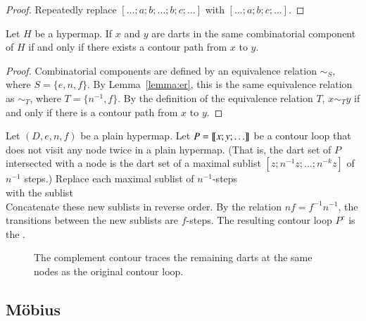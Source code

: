 \begin{proof} Repeatedly replace $[\ldots;a;b;\ldots;b;c;\ldots]$ with
$[\ldots;a;b;c;\ldots]$.
\end{proof}





\begin{lemma}  
Let $H$ be a hypermap.
If $x$ and $y$ are darts in the same combinatorial component of $H$ if and only if
there exists a contour path from $x$ to $y$.
\end{lemma}

\begin{proof} 
Combinatorial components are defined by an equivalence relation $\sim_S$, where
$S = \{e,n,f\}$.  By Lemma~\ref{lemma:er}, this is the same equivalence relation as
$\sim_T$, where $T = \{n^{-1},f\}$.  By the definition of the equivalence relation $T$,
$x\sim_T y$ if and only if there is a contour path from $x$ to $y$.
\end{proof}
%

\begin{definition}[complement] 
Let $(D,e,n,f)$ be a plain hypermap.
Let $P={\llbracket{x;y;\ldots}\rrbracket}$ be a contour loop that does not visit any node
twice in a plain hypermap.   (That is, the dart set of $P$ intersected with a node
is the dart set of a maximal sublist $[z;n^{-1}z;\ldots;n^{-k}z]$ of $n^{-1}$ steps.)
 Replace each maximal sublist of
$n^{-1}$-steps
\begin{displaymath}
[z;n^{-1} z; \ldots; n^{-k} z]
\end{displaymath}
with the sublist
\begin{displaymath}
[n^{-(k+1)} z;n^{-(k+2)} z;\ldots; n z]
\end{displaymath}
Concatenate these new sublists in reverse order.  By the relation $n f = f^{-1} n^{-1}$,
the transitions between the new sublists are $f$-steps.
The resulting contour loop $P^c$
is the . 
\end{definition}

\begin{figure}[htb]
\centering
{}
\caption{The complement contour traces the remaining darts
at the same nodes as the original contour loop. }
\label{fig:contour-comp}
\end{figure}


\subsection{M\"obius}

